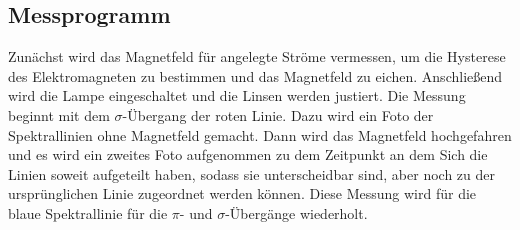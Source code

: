 \subsection{Messprogramm}
Zunächst wird das Magnetfeld für angelegte Ströme vermessen, um die Hysterese des Elektromagneten
zu bestimmen und das Magnetfeld zu eichen.
Anschließend wird die Lampe eingeschaltet und die Linsen werden justiert.
Die Messung beginnt mit dem $\sigma$-Übergang der roten Linie.
Dazu wird ein Foto der Spektrallinien ohne Magnetfeld gemacht.
Dann wird das Magnetfeld hochgefahren und es wird ein zweites Foto aufgenommen
zu dem Zeitpunkt an dem Sich die Linien soweit aufgeteilt haben, sodass sie
unterscheidbar sind, aber noch zu der ursprünglichen Linie zugeordnet werden können.
Diese Messung wird für die blaue Spektrallinie für die $\pi$- und $\sigma$-Übergänge wiederholt.
